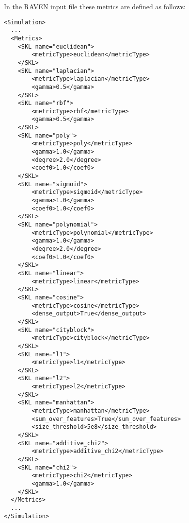 \begin{itemize}
\begin{itemize}
    \end{itemize}
\end{itemize}

In the RAVEN input file these metrics are defined as follows:
\begin{lstlisting}[style=XML]
<Simulation>
  ...
  <Metrics>
    <SKL name="euclidean">
        <metricType>euclidean</metricType>
    </SKL>
    <SKL name="laplacian">
        <metricType>laplacian</metricType>
        <gamma>0.5</gamma>
    </SKL>
    <SKL name="rbf">
        <metricType>rbf</metricType>
        <gamma>0.5</gamma>
    </SKL>
    <SKL name="poly">
        <metricType>poly</metricType>
        <gamma>1.0</gamma>
        <degree>2.0</degree>
        <coef0>1.0</coef0>
    </SKL>
    <SKL name="sigmoid">
        <metricType>sigmoid</metricType>
        <gamma>1.0</gamma>
        <coef0>1.0</coef0>
    </SKL>
    <SKL name="polynomial">
        <metricType>polynomial</metricType>
        <gamma>1.0</gamma>
        <degree>2.0</degree>
        <coef0>1.0</coef0>
    </SKL>
    <SKL name="linear">
        <metricType>linear</metricType>
    </SKL>
    <SKL name="cosine">
        <metricType>cosine</metricType>
        <dense_output>True</dense_output>
    </SKL>
    <SKL name="cityblock">
        <metricType>cityblock</metricType>
    </SKL>
    <SKL name="l1">
        <metricType>l1</metricType>
    </SKL>
    <SKL name="l2">
        <metricType>l2</metricType>
    </SKL>
    <SKL name="manhattan">
        <metricType>manhattan</metricType>
        <sum_over_features>True</sum_over_features>
        <size_threshold>5e8</size_threshold>
    </SKL>
    <SKL name="additive_chi2">
        <metricType>additive_chi2</metricType>
    </SKL>
    <SKL name="chi2">
        <metricType>chi2</metricType>
        <gamma>1.0</gamma>
    </SKL>
  </Metrics>
  ...
</Simulation>
\end{lstlisting}

